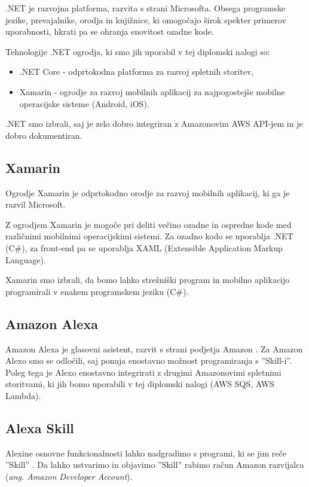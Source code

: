 \documentclass[a4paper, 12pt]{book}
\begin{document}
.NET \cite{dotnet} je razvojna platforma, razvita s strani Microsofta.
Obsega programske jezike, prevajalnike, orodja in knjižnice, ki omogočajo širok spekter primerov uporabnosti, hkrati pa se ohranja enovitost ozadne kode.

Tehnologije .NET ogrodja, ki smo jih uporabil v tej diplomski nalogi so:
\begin{itemize}
	\item .NET Core - odprtokodna platforma za razvoj spletnih storitev,
	\item Xamarin - ogrodje za razvoj mobilnih aplikacij za najpogostejše mobilne operacijske sisteme (Android, iOS).
\end{itemize}

.NET smo izbrali, saj je zelo dobro integriran z Amazonovim AWS API-jem in je dobro dokumentiran.

\subsection{Xamarin}

Ogrodje Xamarin \cite{xamarin} je odprtokodno orodje za razvoj mobilnih aplikacij, ki ga je razvil Microsoft. 

Z ogrodjem Xamarin je mogoče pri deliti večino ozadne in ospredne kode med različnimi mobilnimi operacijskimi sistemi. 
Za ozadno kodo se uporablja .NET (C\#), za front-end pa se uporablja XAML (Extensible Application Markup Language).

Xamarin smo izbrali, da bomo lahko strežniški program in mobilno aplikacijo programirali v enakem programskem jeziku (C\#).

\subsection{Amazon Alexa}

Amazon Alexa je glasovni asistent, razvit s strani podjetja Amazon \cite{alexa}.
Za Amazon Alexo smo se odločili, saj ponuja enostavno možnost programiranja s ''Skill-i''.
Poleg tega je Alexo enostavno integrirati z drugimi Amazonovimi spletnimi storitvami, ki jih bomo uporabili v tej diplomski nalogi (AWS SQS, AWS Lambda).

\subsection{Alexa Skill}

Alexine osnovne funkcionalnosti lahko nadgradimo s programi, ki se jim reče ''Skill'' \cite{alexaskills}.
Da lahko ustvarimo in objavimo ''Skill'' rabimo račun Amazon razvijalca (\textit{ang. Amazon Developer Account}).
\end{document}
